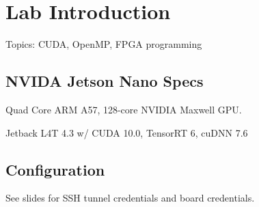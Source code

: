 \chapter{Lab Introduction}

Topics: CUDA, OpenMP, FPGA programming

\section{NVIDA Jetson Nano Specs}
Quad Core ARM A57, 128-core NVIDIA Maxwell GPU.

Jetback L4T 4.3 w/ CUDA 10.0, TensorRT 6, cuDNN 7.6

\section{Configuration}
See slides for SSH tunnel credentials and board credentials.

